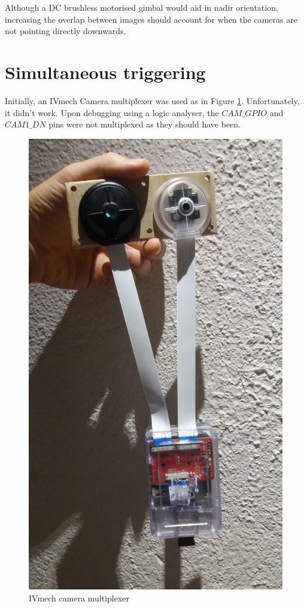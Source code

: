 Although a DC brushless motorised gimbal would aid in nadir orientation, increasing the overlap between images should account for when the cameras are not pointing directly downwards.

\section{Simultaneous triggering}
\label{sec:simultaneous_trig}

Initially, an IVmech Camera multiplexer was used as in Figure \ref{fig:ivmech}. Unfortunately, it didn't work. Upon debugging using a logic analyser, the $CAM\_GPIO$ and $CAM1\_DN$ pins were not multiplexed as they should have been.

\begin{figure}[H]
\centering
\includegraphics[scale=0.25]{images/ivmech.jpg}
\caption{IVmech camera multiplexer}
\label{fig:ivmech}
\end{figure}

